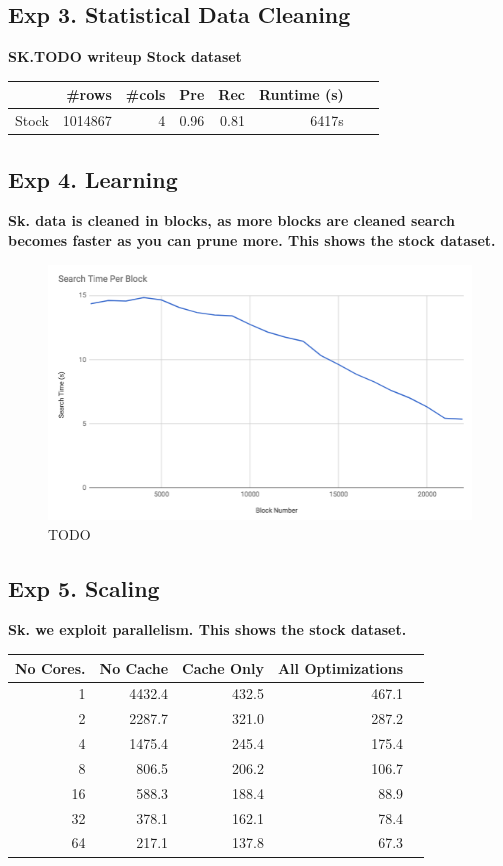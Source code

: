 \subsection*{Exp 3. Statistical Data Cleaning}

\textbf{SK.TODO writeup Stock dataset}


\begin{table}[ht]
\centering
\begin{tabular}{|l|r|r|r|r|r|r|r|}
\hline
 & \#rows & \#cols & Pre & Rec & Runtime (s) \\
\hline
Stock	&1014867&4& 0.96&	0.81&	6417s\\
\hline
\end{tabular}
\end{table}


\subsection*{Exp 4. Learning}
\textbf{Sk. data is cleaned in blocks, as more blocks are cleaned search becomes faster as you can prune more. This shows the stock dataset.}

 \begin{figure}[ht]
\centering
 \includegraphics[width=0.9\columnwidth]{figures/draft-blocks.png}
 \caption{TODO
 \label{fig:opt}}
\end{figure}


\subsection*{Exp 5. Scaling}
\textbf{Sk. we exploit parallelism. This shows the stock dataset.}

\begin{table}[ht]
\centering
\label{my-label}
\begin{tabular}{|r|r|r|r|r|}
\hline
No Cores.   & No Cache & Cache Only & All Optimizations \\
\hline
1 & 4432.4 & 432.5 & 467.1 \\ \hline
2 & 2287.7 & 321.0 & 287.2 \\ \hline
4 & 1475.4 & 245.4 & 175.4 \\ \hline
8 & 806.5  & 206.2 & 106.7 \\ \hline
16 & 588.3  & 188.4 & 88.9  \\ \hline
32 & 378.1  & 162.1 & 78.4  \\ \hline
64 & 217.1  & 137.8 & 67.3    \\
\hline
\end{tabular}
\end{table}